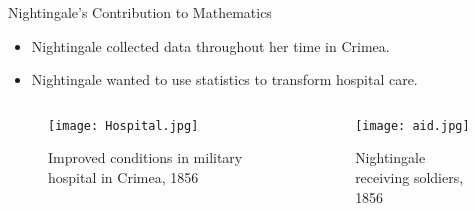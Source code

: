 \documentclass[10pt]{beamer}
\begin{document}
\begin{frame}{Nightingale's Contribution to Mathematics}
  \begin{itemize}
    \item Nightingale collected data throughout her time in Crimea.
    \item Nightingale wanted to use statistics to transform hospital care. 
  \end{itemize}
  \vfill
  \begin{columns}[T]
    \begin{column}{.5\textwidth}
          \begin{figure}
            \vspace*{\fill}
            \begin{center}
          \texttt{[image: Hospital.jpg]}
        \caption{Improved conditions in military hospital in Crimea, 1856}
            \end{center}
            \vspace*{\fill}
          \end{figure}
        \end{column}

        \begin{column}{.5\textwidth}
              \begin{figure}
                \vspace*{\fill}
                \begin{center}
              \texttt{[image: aid.jpg]}
            \caption{Nightingale receiving soldiers, 1856}
                \end{center}
                \vspace*{\fill}
              \end{figure}
            \end{column}
  \end{columns}
\end{frame}
\end{document}
